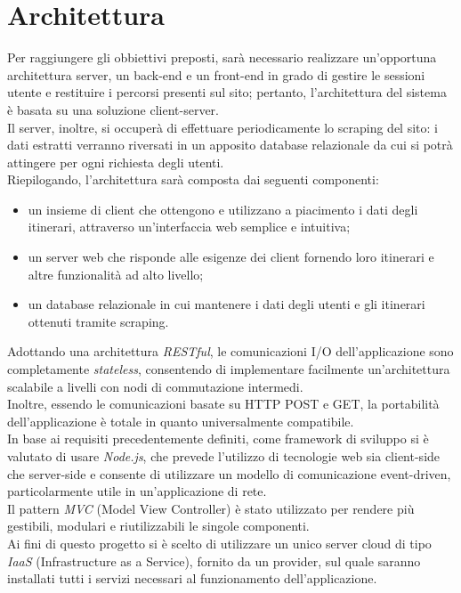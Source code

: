 \documentclass[11pt]{report}
\begin{document}
\section{Architettura}
Per raggiungere gli obbiettivi preposti, sarà necessario realizzare un'opportuna architettura server, un back-end e un front-end in grado di gestire le sessioni utente e restituire i percorsi presenti sul sito; pertanto, l'architettura del sistema è basata su una soluzione client-server.
\\Il server, inoltre, si occuperà di effettuare periodicamente lo scraping del sito: i dati estratti verranno riversati in un apposito database relazionale da cui si potrà attingere per ogni richiesta degli utenti.
\\Riepilogando, l'architettura sarà composta dai seguenti componenti:
\begin{itemize}
	\item un insieme di client che ottengono e utilizzano a piacimento i dati degli itinerari, attraverso un'interfaccia web semplice e intuitiva;
	\item un server web che risponde alle esigenze dei client fornendo loro itinerari e altre funzionalità ad alto livello;
	\item un database relazionale in cui mantenere i dati degli utenti e gli itinerari ottenuti tramite scraping.
\end{itemize}
Adottando una architettura \textit{RESTful}, le comunicazioni I/O dell'applicazione sono completamente \textit{stateless}, consentendo di implementare facilmente un'architettura scalabile a livelli con nodi di commutazione intermedi.
\\Inoltre, essendo le comunicazioni basate su HTTP POST e GET, la portabilità dell'applicazione è totale in quanto universalmente compatibile.
\\In base ai requisiti precedentemente definiti, come framework di sviluppo si è valutato di usare \textit{Node.js}, che prevede l'utilizzo di tecnologie web sia client-side che server-side e consente di utilizzare un modello di comunicazione event-driven, particolarmente utile in un'applicazione di rete.
\\Il pattern \textit{MVC} (Model View Controller) è stato utilizzato per rendere più gestibili, modulari e riutilizzabili le singole componenti.
\\Ai fini di questo progetto si è scelto di utilizzare un unico server cloud di tipo \textit{IaaS} (Infrastructure as a Service), fornito da un provider, sul quale saranno installati tutti i servizi necessari al funzionamento dell'applicazione.
\end{document}
